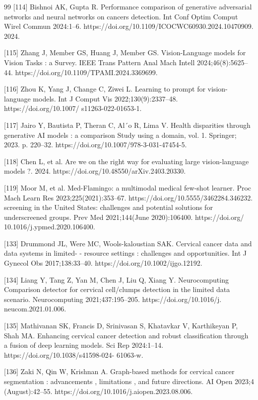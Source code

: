 \documentclass[final,5p,times,twocolumn,authoryear]{elsarticle}
\begin{document}
\begin{thebibliography}{99}
 [114] Bishnoi AK, Gupta R. Performance comparison of generative adversarial networks and neural networks on cancers detection. Int Conf Optim Comput Wirel Commun 2024:1–6. https://doi.org/10.1109/ICOCWC60930.2024.10470909. 2024.

 [115] Zhang J, Member GS, Huang J, Member GS. Vision-Language models for Vision Tasks : a Survey. IEEE Trans Pattern Anal Mach Intell 2024;46(8):5625–44. https://doi.org/10.1109/TPAMI.2024.3369699.

 [116] Zhou K, Yang J, Change C, Ziwei L. Learning to prompt for vision-language models. Int J Comput Vis 2022;130(9):2337–48. https://doi.org/10.1007/ s11263-022-01653-1.

 [117] Jairo Y, Bautista P, Theran C, Al´o R, Lima V. Health disparities through generative AI models : a comparison Study using a domain, vol. 1. Springer; 2023. p. 220–32. https://doi.org/10.1007/978-3-031-47454-5.

 [118] Chen L, et al. Are we on the right way for evaluating large vision-language models ?. 2024. https://doi.org/10.48550/arXiv.2403.20330.

 [119] Moor M, et al. Med-Flamingo: a multimodal medical few-shot learner. Proc Mach Learn Res 2023;225(2021):353–67. https://doi.org/10.5555/3462284.346232. screening in the United States: challenges and potential solutions for underscreened groups. Prev Med 2021;144(June 2020):106400. https://doi.org/ 10.1016/j.ypmed.2020.106400.

 [133] Drummond JL, Were MC, Wools-kaloustian SAK. Cervical cancer data and data systems in limited- - resource settings : challenges and opportunities. Int J Gynecol Obs 2017;138:33–40. https://doi.org/10.1002/ijgo.12192.

 [134] Liang Y, Tang Z, Yan M, Chen J, Liu Q, Xiang Y. Neurocomputing Comparison detector for cervical cell/clumps detection in the limited data scenario. Neurocomputing 2021;437:195–205. https://doi.org/10.1016/j. neucom.2021.01.006.

 [135] Mathivanan SK, Francis D, Srinivasan S, Khatavkar V, Karthikeyan P, Shah MA. Enhancing cervical cancer detection and robust classification through a fusion of deep learning models. Sci Rep 2024:1–14. https://doi.org/10.1038/s41598-024- 61063-w.

 [136] Zaki N, Qin W, Krishnan A. Graph-based methods for cervical cancer segmentation : advancements , limitations , and future directions. AI Open 2023;4 (August):42–55. https://doi.org/10.1016/j.aiopen.2023.08.006.


\end{thebibliography}
\end{document}
